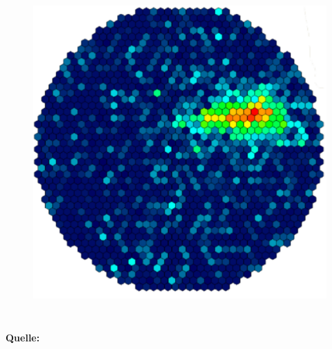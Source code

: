 \documentclass[aspectratio=1610, professionalfonts, 9pt]{beamer}
\begin{document}
\begin{frame}
\begin{columns}[onlytextwidth]
\begin{figure}
	  \includegraphics[height=0.8\textheight]{./images/Hadron.pdf} \\
	\end{figure}
  \end{columns}
  {\tiny \textbf{Quelle:} \cite{FACT}}
\end{frame}
\end{document}

